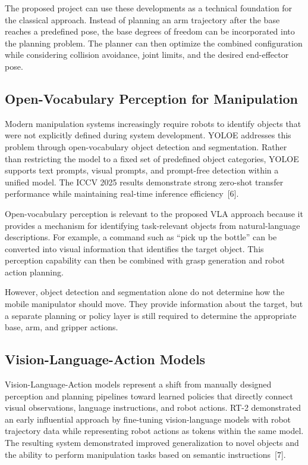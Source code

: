 \documentclass[12pt,a4paper]{article}
\begin{document}
The proposed project can use these developments as a technical foundation for the
classical approach. Instead of planning an arm trajectory after the base reaches a predefined
pose, the base degrees of freedom can be incorporated into the planning problem. The planner
can then optimize the combined configuration while considering collision avoidance, joint limits,
and the desired end-effector pose.

\subsection*{Open-Vocabulary Perception for Manipulation}

Modern manipulation systems increasingly require robots to identify objects that were
not explicitly defined during system development. YOLOE addresses this problem through
open-vocabulary object detection and segmentation. Rather than restricting the model to a
fixed set of predefined object categories, YOLOE supports text prompts, visual prompts, and
prompt-free detection within a unified model. The ICCV 2025 results demonstrate strong
zero-shot transfer performance while maintaining real-time inference efficiency~[6].

Open-vocabulary perception is relevant to the proposed VLA approach because it
provides a mechanism for identifying task-relevant objects from natural-language descriptions.
For example, a command such as ``pick up the bottle'' can be converted into visual information
that identifies the target object. This perception capability can then be combined with grasp
generation and robot action planning.

However, object detection and segmentation alone do not determine how the mobile
manipulator should move. They provide information about the target, but a separate planning
or policy layer is still required to determine the appropriate base, arm, and gripper actions.

\newpage
\subsection*{Vision-Language-Action Models}

Vision-Language-Action models represent a shift from manually designed perception
and planning pipelines toward learned policies that directly connect visual observations,
language instructions, and robot actions. RT-2 demonstrated an early influential approach by
fine-tuning vision-language models with robot trajectory data while representing robot actions
as tokens within the same model. The resulting system demonstrated improved generalization
to novel objects and the ability to perform manipulation tasks based on semantic instructions~[7].
\end{document}
